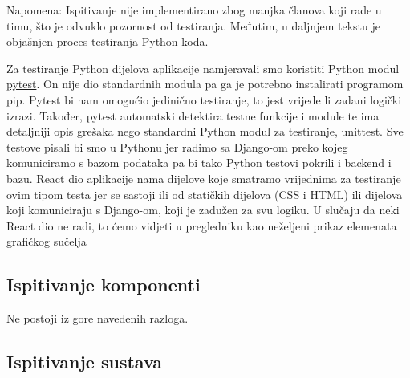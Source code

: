 			Napomena: Ispitivanje nije implementirano zbog manjka članova koji rade u timu, što je odvuklo pozornost od testiranja. Međutim, u daljnjem tekstu je objašnjen proces testiranja Python koda.
			
			Za testiranje Python dijelova aplikacije namjeravali smo koristiti Python modul \href{https://docs.pytest.org/en/7.4.x/index.html}{pytest}. On nije dio standardnih modula pa ga je potrebno instalirati programom pip. Pytest bi nam omogućio jedinično testiranje, to jest vrijede li zadani logički izrazi. Također, pytest automatski detektira testne funkcije i module te ima detaljniji opis grešaka nego  standardni Python modul za testiranje, unittest. Sve testove pisali bi smo u Pythonu jer radimo sa Django-om preko kojeg komuniciramo s bazom podataka pa bi tako Python testovi pokrili i backend i bazu. React dio aplikacije nama dijelove koje smatramo vrijednima za testiranje ovim tipom testa jer se sastoji ili od statičkih dijelova (CSS i HTML) ili dijelova koji komuniciraju s Django-om, koji je zadužen za svu logiku. U slučaju da neki React dio ne radi, to ćemo vidjeti u pregledniku kao neželjeni prikaz elemenata grafičkog sučelja
			
			\subsection{Ispitivanje komponenti}
				Ne postoji iz gore navedenih razloga.
			
			
			
			\subsection{Ispitivanje sustava}
			

